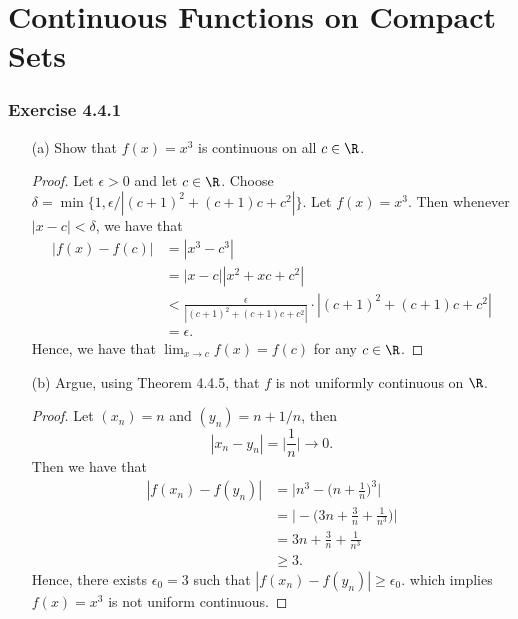 \section{Continuous Functions on Compact Sets}
\subsubsection{Exercise 4.4.1}

\begin{enumerate}
    \item[(a)] Show that \( f(x) = x^3  \) is continuous on all \( c \in \R  \).
        \begin{proof}
Let \( \epsilon > 0  \) and let \( c \in \R  \). Choose \( \delta = \min \{ 1, \epsilon / | (c+1)^2 + (c+1)c + c^2 |   \}   \). Let \( f(x) = x^3  \). Then whenever \( | x - c  | < \delta  \), we have that 
\begin{align*}
    | f(x) - f(c)  | &= |  x^3 - c^3  |  \\
                     &=|x - c   | | x^2 + xc + c^2  | \\ 
                     &< \frac{ \epsilon  }{ | (c+1)^2 + (c+1)c + c^2 |  }  \cdot | (c + 1)^2 + (c + 1)c + c^2  |  \\
                     &= \epsilon.
\end{align*}
Hence, we have that \(\lim_{ x  \to c  } f(x) = f(c) \) for any \( c \in \R  \).
        \end{proof}
    \item[(b)] Argue, using Theorem 4.4.5, that \( f  \) is not uniformly continuous on \( \R  \).
        \begin{proof}
            Let \( (x_n) = n    \) and \( (y_n) = n + 1 / n   \), then 
            \[  | x_n - y_n | = \Big| \frac{ 1 }{ n }  \Big| \to 0.  \]
            Then we have that 
            \begin{align*}
                | f(x_n) - f(y_n)  | &= \Big| n^3 - \Big( n + \frac{ 1 }{ n }  \Big)^3  \Big|  \\
                                     &= \Big| - \Big( 3n + \frac{ 3 }{ n } + \frac{ 1 }{ n^3 } \Big) \Big| \\
                                     &= 3n + \frac{ 3 }{ n } + \frac{ 1 }{ n^3 } \\  
                                     &\geq 3.
            \end{align*}
            Hence, there exists \( \epsilon_0 = 3  \) such that \( | f(x_n) - f(y_n) | \geq \epsilon_0. \) which implies \( f(x) = x^3  \) is not uniform continuous.

\end{proof}
\end{enumerate}
